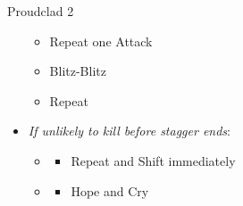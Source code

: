 \begin{paracol}{2}
\begin{battle}{Proudclad 2}
\begin{itemize}
    \begin{itemize}
        \item Repeat one Attack
        \item Blitz-Blitz
        \item Repeat
    \end{itemize}
    \item \textit{If unlikely to kill before stagger ends}:
    \begin{itemize}
        \item \first
        \begin{itemize}
            \item Repeat and Shift immediately
        \end{itemize}
        \item \second
        \begin{itemize}
            \item Hope and Cry
        \end{itemize}
    \end{itemize}
\end{itemize}
\end{battle}
\switchcolumn*
{}
\switchcolumn
{}
\end{paracol}